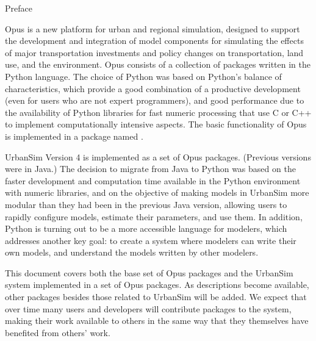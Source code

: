 
{\huge Preface}
\label{preface}


Opus is a new platform for urban and regional simulation, designed to
support the development and integration of model
components  for simulating the
effects of major transportation investments and policy changes
on transportation,  land use, 
and the environment. 
Opus consists of a collection of packages 
written in the Python \pythonindex language. The choice of
Python \pythonindex was based on Python's \pythonindex
balance of characteristics, which provide a good combination of a
productive development (even for users who are not expert programmers), and
good performance  due to the availability of Python \pythonindex
libraries  for fast
numeric processing  that use C or C++
to implement computationally intensive
aspects.  The basic functionality of Opus is implemented in a package named .

UrbanSim Version 4  is implemented as a set of
Opus packages. (Previous versions  were in Java.) 
The decision to migrate from Java to Python 
was based on the faster development and computation time available
in the Python environment with numeric libraries, and on the objective of
making models  in UrbanSim more modular than they had been in the previous
Java version, allowing users to rapidly configure models,  estimate their
parameters, and use them. In addition, Python is turning out to be a more
accessible language for modelers, which addresses another key goal:  to
create a system where modelers can write their own models, and understand
the models written by other modelers.


This document covers both the base set of Opus packages and the UrbanSim
system implemented in a set of Opus packages.  As descriptions
become available, other packages besides those related to UrbanSim will be
added.  We expect that over time many users and developers will contribute
packages to the system, making their work available to others in the same
way that they themselves have benefited from others' work.

